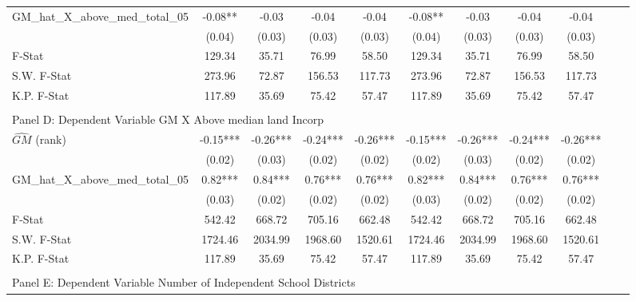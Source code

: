 \begin{table}[htbp]
\begin{threeparttable}
\begin{tabular}{l*{10}{c}}
\addlinespace
GM\_hat\_X\_above\_med\_total\_05&      -0.08** &      -0.03   &      -0.04   &      -0.04   &      -0.08** &      -0.03   &      -0.04   &      -0.04   \\
                &     (0.04)   &     (0.03)   &     (0.03)   &     (0.03)   &     (0.04)   &     (0.03)   &     (0.03)   &     (0.03)   \\
\midrule
F-Stat          &     129.34   &      35.71   &      76.99   &      58.50   &     129.34   &      35.71   &      76.99   &      58.50   \\
S.W. F-Stat     &     273.96   &      72.87   &     156.53   &     117.73   &     273.96   &      72.87   &     156.53   &     117.73   \\
K.P. F-Stat     &     117.89   &      35.69   &      75.42   &      57.47   &     117.89   &      35.69   &      75.42   &      57.47   \\
\cmidrule[\heavyrulewidth](lr){1-9} \\ \cmidrule[\heavyrulewidth](lr){1-9}
\multicolumn{8}{l}{Panel D: Dependent Variable GM X Above median land Incorp}\\
\cmidrule(lr){1-9}
$\hat{GM}$ (rank)&      -0.15***&      -0.26***&      -0.24***&      -0.26***&      -0.15***&      -0.26***&      -0.24***&      -0.26***\\
                &     (0.02)   &     (0.03)   &     (0.02)   &     (0.02)   &     (0.02)   &     (0.03)   &     (0.02)   &     (0.02)   \\
\addlinespace
GM\_hat\_X\_above\_med\_total\_05&       0.82***&       0.84***&       0.76***&       0.76***&       0.82***&       0.84***&       0.76***&       0.76***\\
                &     (0.03)   &     (0.02)   &     (0.02)   &     (0.02)   &     (0.03)   &     (0.02)   &     (0.02)   &     (0.02)   \\
\midrule
F-Stat          &     542.42   &     668.72   &     705.16   &     662.48   &     542.42   &     668.72   &     705.16   &     662.48   \\
S.W. F-Stat     &    1724.46   &    2034.99   &    1968.60   &    1520.61   &    1724.46   &    2034.99   &    1968.60   &    1520.61   \\
K.P. F-Stat     &     117.89   &      35.69   &      75.42   &      57.47   &     117.89   &      35.69   &      75.42   &      57.47   \\
\cmidrule[\heavyrulewidth](lr){1-9} \\ \cmidrule[\heavyrulewidth](lr){1-9}
\multicolumn{8}{l}{Panel E: Dependent Variable Number of Independent School Districts}\\

\end{tabular}
\end{threeparttable}
\end{table}

